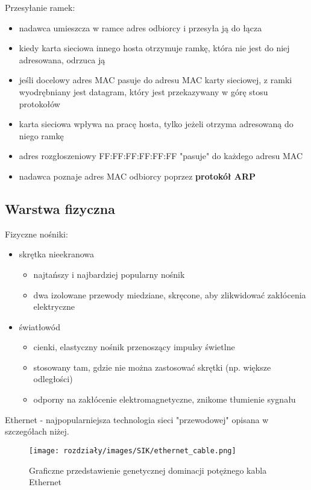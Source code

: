 Przesyłanie ramek:
\begin{itemize}
    \item nadawca umieszcza w ramce adres odbiorcy i przesyła ją do łącza
    \item kiedy karta sieciowa innego hosta otrzymuje ramkę, która nie jest do niej adresowana, odrzuca ją
    \item jeśli docelowy adres MAC pasuje do adresu MAC karty sieciowej, z ramki wyodrębniany jest datagram, który jest przekazywany w górę stosu protokołów
    \item karta sieciowa wpływa na pracę hosta, tylko jeżeli otrzyma adresowaną do niego ramkę
    \item adres rozgłoszeniowy FF:FF:FF:FF:FF:FF "pasuje" do każdego adresu MAC
    \item nadawca poznaje adres MAC odbiorcy poprzez \textbf{protokół ARP}
\end{itemize}


\subsection{Warstwa fizyczna}
Fizyczne nośniki:
\begin{itemize}
    \item skrętka nieekranowa
    \begin{itemize}
        \item najtańszy i najbardziej popularny nośnik
        \item dwa izolowane przewody miedziane, skręcone, aby zlikwidować zakłócenia elektryczne
    \end{itemize}
    \item światłowód
    \begin{itemize}
        \item cienki, elastyczny nośnik przenoszący impulsy świetlne
        \item stosowany tam, gdzie nie można zastosować skrętki (np. większe odległości)
        \item odporny na zakłócenie elektromagnetyczne, znikome tłumienie sygnału
    \end{itemize}
\end{itemize}

Ethernet - najpopularniejsza technologia sieci "przewodowej" opisana w szczegółach niżej.

\begin{figure}[H]
    \centering
    \texttt{[image: rozdziały/images/SIK/ethernet\_cable.png]}
    \caption{Graficzne przedstawienie genetycznej dominacji potężnego kabla Ethernet}
\end{figure}


